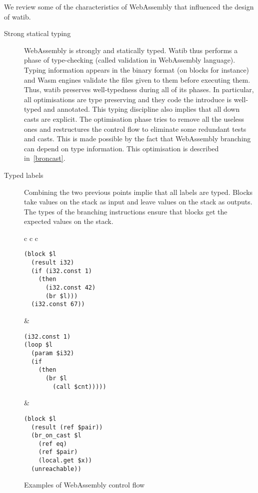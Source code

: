 \documentclass[10pt]{article}
\begin{document}
We review some of the characteristics of WebAssembly that influenced the design
of watib.

\begin{description}
\item[Strong statical typing] WebAssembly is strongly and statically typed.
  Watib thus performs a phase of type-checking (called validation in WebAssembly
  language). Typing information appears in the binary format (on blocks for
  instance) and Wasm engines validate the files given to them before executing
  them. Thus, watib preserves well-typedness during all of its phases. In
  particular, all optimisations are type preserving and they code the introduce
  is well-typed and annotated. This typing discipline also implies that all down
  casts are explicit. The optimisation phase tries to remove all the useless
  ones and restructures the control flow to eliminate some redundant tests and
  casts. This is made possible by the fact that WebAssembly branching can depend
  on type information. This optimisation is described in~\ref{broncast}.


\item[Typed labels]
Combining the two previous points implie that all labels are typed. Blocks take
values on the stack as input and leave values on the stack as outputs. The types
of the branching instructions ensure that blocks get the expected values on the
stack.
\end{description}
\begin{figure}[h]
\centering
\begin{tabular}{c c c}
\begin{minipage}{1.8in}
\begin{verbatim}
(block $l
  (result i32)
  (if (i32.const 1)
    (then
      (i32.const 42)
      (br $l)))
  (i32.const 67))
\end{verbatim}
\end{minipage}&
\begin{minipage}{1.8in}
\begin{verbatim}
(i32.const 1)
(loop $l
  (param $i32)
  (if
    (then
      (br $l
        (call $cnt)))))
\end{verbatim}
\end{minipage}
&\begin{minipage}{1.8in}
\begin{verbatim}
(block $l
  (result (ref $pair))
  (br_on_cast $l
    (ref eq)
    (ref $pair)
    (local.get $x))
  (unreachable))
\end{verbatim}
\end{minipage}
\end{tabular}
\caption{Examples of WebAssembly control flow}\label{cf-ex}
\end{figure}
\end{document}
